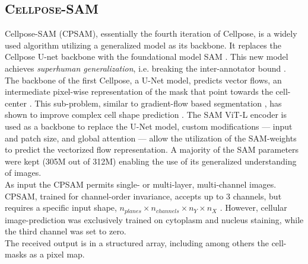 \subsection*{\color{cpsam}\textsc{Cellpose-SAM}}
Cellpose-SAM (CPSAM), essentially the fourth iteration of Cellpose, is a widely used algorithm utilizing a generalized model as its backbone. It replaces the Cellpose U-net backbone with the foundational model SAM \cite{kirillov_segment_2023}. This new model achieves \textit{superhuman generalization}, i.e. breaking the inter-annotator bound \cite{pachitariu_cellpose-sam_2025}.\\
The backbone of the first Cellpose, a U-Net model, predicts vector flows, an intermediate pixel-wise representation of the mask that point towards the cell-center \cite{stringer_cellpose_2021}. This sub-problem, similar to gradient-flow based segmentation \cite{li_segmentation_2008}, has shown to improve complex cell shape prediction \cite{stringer_cellpose_2021}. The SAM ViT-L encoder is used as a backbone to replace the U-Net model, custom modifications --- input and patch size, and global attention --- allow the utilization of the SAM-weights to predict the vectorized flow representation. A majority of the SAM parameters were kept (305M out of 312M) enabling the use of its generalized understanding of images.\\
As input the CPSAM permits single- or multi-layer, multi-channel images. CPSAM, trained for channel-order invariance, accepts up to 3 channels, but requires a specific input shape, $n_{planes} \times n_{channels} \times n_{Y} \times n_{X}$ . However, cellular image-prediction was exclusively trained on cytoplasm and nucleus staining, while the third channel was set to zero.\\
The received output is in a structured array, including among others the cell-masks as a pixel map.
